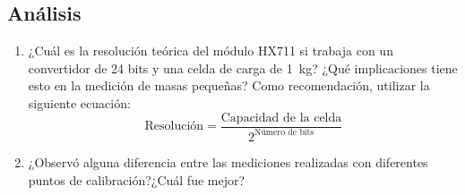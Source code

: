 \documentclass[12pt,letterpaper]{report}
\begin{document}


\subsection{Análisis}
\begin{enumerate}
    \item ¿Cuál es la resolución teórica del módulo HX711 si trabaja con un convertidor de 24 bits y una celda de carga de \SI{1}{\kilogram}? ¿Qué implicaciones tiene esto en la medición de masas pequeñas? Como recomendación, utilizar la siguiente ecuación:
    \begin{equation*}
        \text{Resolución} = \frac{\text{Capacidad de la celda}}{2^{\text{Número de bits}}}
    \end{equation*} 
    \item ¿Observó alguna diferencia entre las mediciones realizadas con diferentes puntos de calibración?¿Cuál fue mejor?
\end{enumerate}
\printbibliography
\end{document}
